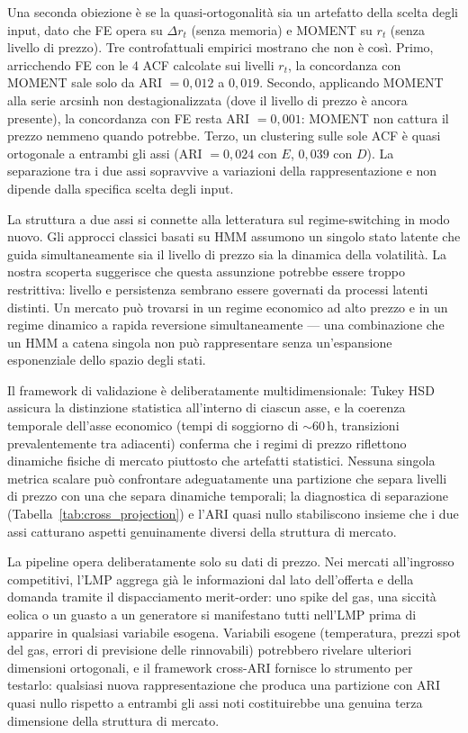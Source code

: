 \documentclass[12pt]{article}
\begin{document}
Una seconda obiezione è se la quasi-ortogonalità sia un artefatto della scelta degli input, dato che FE opera su $\Delta r_t$ (senza memoria) e MOMENT su $r_t$ (senza livello di prezzo).
Tre controfattuali empirici mostrano che non è così.
Primo, arricchendo FE con le 4 ACF calcolate sui livelli $r_t$, la concordanza con MOMENT sale solo da ARI $= 0{,}012$ a $0{,}019$.
Secondo, applicando MOMENT alla serie arcsinh non destagionalizzata (dove il livello di prezzo è ancora presente), la concordanza con FE resta ARI $= 0{,}001$: MOMENT non cattura il prezzo nemmeno quando potrebbe.
Terzo, un clustering sulle sole ACF è quasi ortogonale a entrambi gli assi (ARI $= 0{,}024$ con $E$, $0{,}039$ con $D$).
La separazione tra i due assi sopravvive a variazioni della rappresentazione e non dipende dalla specifica scelta degli input.


La struttura a due assi si connette alla letteratura sul regime-switching in modo nuovo.
Gli approcci classici basati su HMM assumono un singolo stato latente che guida simultaneamente sia il livello di prezzo sia la dinamica della volatilità.
La nostra scoperta suggerisce che questa assunzione potrebbe essere troppo restrittiva: livello e persistenza sembrano essere governati da processi latenti distinti.
Un mercato può trovarsi in un regime economico ad alto prezzo e in un regime dinamico a rapida reversione simultaneamente --- una combinazione che un HMM a catena singola non può rappresentare senza un'espansione esponenziale dello spazio degli stati.


Il framework di validazione è deliberatamente multidimensionale: Tukey HSD assicura la distinzione statistica all'interno di ciascun asse, e la coerenza temporale dell'asse economico (tempi di soggiorno di $\sim$60\,h, transizioni prevalentemente tra adiacenti) conferma che i regimi di prezzo riflettono dinamiche fisiche di mercato piuttosto che artefatti statistici.
Nessuna singola metrica scalare può confrontare adeguatamente una partizione che separa livelli di prezzo con una che separa dinamiche temporali; la diagnostica di separazione (Tabella~\ref{tab:cross_projection}) e l'ARI quasi nullo stabiliscono insieme che i due assi catturano aspetti genuinamente diversi della struttura di mercato.


La pipeline opera deliberatamente solo su dati di prezzo.
Nei mercati all'ingrosso competitivi, l'LMP aggrega già le informazioni dal lato dell'offerta e della domanda tramite il dispacciamento merit-order: uno spike del gas, una siccità eolica o un guasto a un generatore si manifestano tutti nell'LMP prima di apparire in qualsiasi variabile esogena.
Variabili esogene (temperatura, prezzi spot del gas, errori di previsione delle rinnovabili) potrebbero rivelare ulteriori dimensioni ortogonali, e il framework cross-ARI fornisce lo strumento per testarlo: qualsiasi nuova rappresentazione che produca una partizione con ARI quasi nullo rispetto a entrambi gli assi noti costituirebbe una genuina terza dimensione della struttura di mercato.
\end{document}
